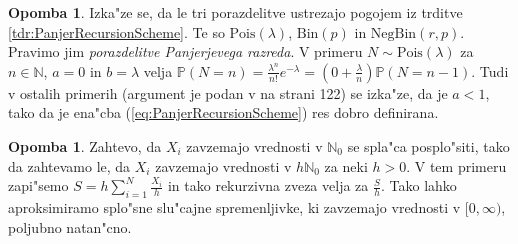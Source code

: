 \documentclass[12pt, a4paper, reqno]{amsart}
\theoremstyle{definition}
\newtheorem{opomba}[definicija]{Opomba}
\theoremstyle{plain}
\newcommand{\N}{\mathbb{N}}
\newcommand{\Prob}{\mathbb{P}}
\newcommand{\1}{\mathds{1}}
\newcommand{\Pois}[1]{\text{Pois}(#1)}
\begin{document}
    \begin{opomba}
        Izka"ze se, da le tri porazdelitve 
        ustrezajo pogojem iz trditve \ref{tdr:PanjerRecursionScheme}. Te so $\Pois{\lambda}$, $\text{Bin}(p)$ in
        $\text{NegBin}(r, p)$. Pravimo jim \textit{porazdelitve Panjerjevega razreda}. V primeru $N\sim\Pois{\lambda}$ za $n\in\N$, $a = 0$ in $b = \lambda$ velja $\Prob\left(N = n\right) = \frac{\lambda^n}{n!}e^{-\lambda} = 
        \left(0 + \frac{\lambda}{n}\right)\Prob\left(N = n - 1\right)$. 
        Tudi v ostalih primerih (argument je podan v \cite{4} na strani 122) se izka"ze, da je $a < 1$, tako da je 
        ena"cba (\ref{eq:PanjerRecursionScheme}) res dobro definirana.
        \label{op:PanjerRazsiritev}
    \end{opomba}

    \begin{opomba}
        Zahtevo, da $X_i$ zavzemajo vrednosti v $\N_0$ se spla"ca posplo"siti, tako da 
        zahtevamo le, da $X_i$ zavzemajo vrednosti v $h\N_0$ za neki $h>0$. V tem primeru 
        zapi"semo $S = h\sum_{i=1}^N\frac{X_i}{h}$ in tako rekurzivna zveza velja za $\frac{S}{h}$. 
        Tako lahko aproksimiramo splo"sne slu"cajne 
        spremenljivke, ki zavzemajo vrednosti v $[0, \infty)$, poljubno natan"cno.
    \end{opomba}  
\end{document}
